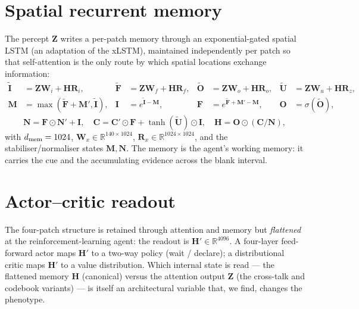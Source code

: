 \section{Spatial recurrent memory}
The percept $\mathbf Z$ writes a per-patch memory through an exponential-gated spatial
LSTM (an adaptation of the xLSTM), maintained independently per patch so that
self-attention is the only route by which spatial locations exchange information:
\begin{align*}
\tilde{\mathbf I}&=\mathbf Z\mathbf W_i+\mathbf H\mathbf R_i, &
\tilde{\mathbf F}&=\mathbf Z\mathbf W_f+\mathbf H\mathbf R_f, &
\tilde{\mathbf O}&=\mathbf Z\mathbf W_o+\mathbf H\mathbf R_o, &
\tilde{\mathbf U}&=\mathbf Z\mathbf W_u+\mathbf H\mathbf R_z,\\
\mathbf M&=\max(\tilde{\mathbf F}+\mathbf M',\tilde{\mathbf I}), &
\mathbf I&=e^{\tilde{\mathbf I}-\mathbf M}, &
\mathbf F&=e^{\tilde{\mathbf F}+\mathbf M'-\mathbf M}, &
\mathbf O&=\sigma(\tilde{\mathbf O}),
\end{align*}
\[
\mathbf N=\mathbf F\odot\mathbf N'+\mathbf I,\quad
\mathbf C=\mathbf C'\odot\mathbf F+\tanh(\tilde{\mathbf U})\odot\mathbf I,\quad
\mathbf H=\mathbf O\odot(\mathbf C/\mathbf N),
\]
with $d_{\text{mem}}=1024$, $\mathbf W_x\in\mathbb R^{140\times1024}$, $\mathbf
R_x\in\mathbb R^{1024\times1024}$, and the stabiliser/normaliser states $\mathbf M,\mathbf
N$. The memory is the agent's working memory: it carries the cue and the accumulating
evidence across the blank interval.

\section{Actor--critic readout}
The four-patch structure is retained through attention and memory but \emph{flattened} at
the reinforcement-learning agent: the readout is $\mathbf H'\in\mathbb R^{4096}$. A
four-layer feed-forward actor maps $\mathbf H'$ to a two-way policy (wait / declare); a
distributional critic maps $\mathbf H'$ to a value distribution. Which internal state is
read --- the flattened memory $\mathbf H$ (canonical) versus the attention output
$\mathbf Z$ (the cross-talk and codebook variants) --- is itself an architectural variable
that, we find, changes the phenotype.

